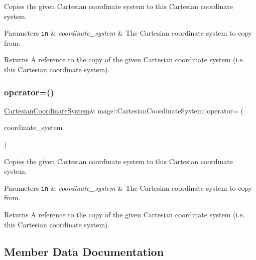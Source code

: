 Copies the given Cartesian coordinate system to this Cartesian coordinate system.


\begin{DoxyParams}[1]{Parameters}
\mbox{\tt in}  & {\em coordinate\+\_\+system} & The Cartesian coordinate system to copy from. \\
\hline
\end{DoxyParams}
\begin{DoxyReturn}{Returns}
A reference to the copy of the given Cartesian coordinate system (i.\+e. this Cartesian coordinate system). 
\end{DoxyReturn}
\hypertarget{structmage_1_1_cartesian_coordinate_system_afc51347ff3f42576c483c76f5747c4c6}{}\label{structmage_1_1_cartesian_coordinate_system_afc51347ff3f42576c483c76f5747c4c6} 
\subsubsection{\texorpdfstring{operator=()}{operator=()}\hspace{0.1cm}{\footnotesize\ttfamily [2/2]}}
{\footnotesize\ttfamily \hyperlink{structmage_1_1_cartesian_coordinate_system}{Cartesian\+Coordinate\+System}\& mage\+::\+Cartesian\+Coordinate\+System\+::operator= (\begin{DoxyParamCaption}\item[{\hyperlink{structmage_1_1_cartesian_coordinate_system}{Cartesian\+Coordinate\+System} \&\&}]{coordinate\+\_\+system }\end{DoxyParamCaption})\hspace{0.3cm}{\ttfamily [default]}}

Copies the given Cartesian coordinate system to this Cartesian coordinate system.


\begin{DoxyParams}[1]{Parameters}
\mbox{\tt in}  & {\em coordinate\+\_\+system} & The Cartesian coordinate system to copy from. \\
\hline
\end{DoxyParams}
\begin{DoxyReturn}{Returns}
A reference to the copy of the given Cartesian coordinate system (i.\+e. this Cartesian coordinate system). 
\end{DoxyReturn}


\subsection{Member Data Documentation}
\hypertarget{structmage_1_1_cartesian_coordinate_system_acf7b8cf35026f5fa8fc11a126b96b055}{}\label{structmage_1_1_cartesian_coordinate_system_acf7b8cf35026f5fa8fc11a126b96b055} 
